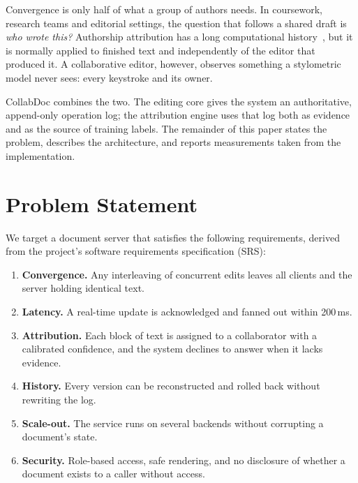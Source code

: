 \documentclass[conference]{IEEEtran}
\begin{document}
Convergence is only half of what a group of authors needs. In coursework, research teams and editorial settings, the question that follows a shared draft is \emph{who wrote this?} Authorship attribution has a long computational history~\cite{mosteller1963,stamatatos2009,koppel2009,juola2006}, but it is normally applied to finished text and independently of the editor that produced it. A collaborative editor, however, observes something a stylometric model never sees: every keystroke and its owner.

CollabDoc combines the two. The editing core gives the system an authoritative, append-only operation log; the attribution engine uses that log both as evidence and as the source of training labels. The remainder of this paper states the problem, describes the architecture, and reports measurements taken from the implementation.

\section{Problem Statement}
We target a document server that satisfies the following requirements, derived from the project's software requirements specification (SRS):
\begin{enumerate}
\item \textbf{Convergence.} Any interleaving of concurrent edits leaves all clients and the server holding identical text.
\item \textbf{Latency.} A real-time update is acknowledged and fanned out within 200\,ms.
\item \textbf{Attribution.} Each block of text is assigned to a collaborator with a calibrated confidence, and the system declines to answer when it lacks evidence.
\item \textbf{History.} Every version can be reconstructed and rolled back without rewriting the log.
\item \textbf{Scale-out.} The service runs on several backends without corrupting a document's state.
\item \textbf{Security.} Role-based access, safe rendering, and no disclosure of whether a document exists to a caller without access.
\end{enumerate}

\end{document}
